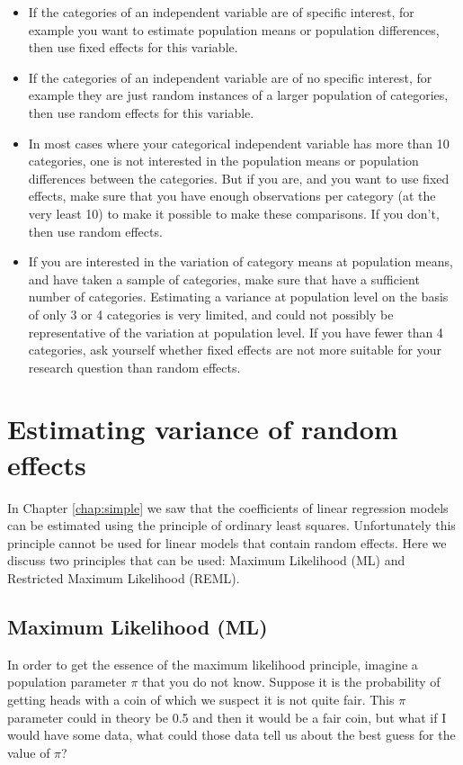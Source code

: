 \begin{itemize}
\item
If the categories of an independent variable are of specific interest, for example you want to estimate population means or population differences, then use fixed effects for this variable.
\item
If the categories of an independent variable are of no specific interest, for example they are just random instances of a larger population of categories, then use random effects for this variable.
\item
In most cases where your categorical independent variable has more than 10 categories, one is not interested in the population means or population differences between the categories. But if you are, and you want to use fixed effects, make sure that you have enough observations per category (at the very least 10) to make it possible to make these comparisons. If you don't, then use random effects.
\item
If you are interested in the variation of category means at population means, and have taken a sample of categories, make sure that have a sufficient number of categories. Estimating a variance at population level on the basis of only 3 or 4 categories is very limited, and could not possibly be representative of the variation at population level. If you have fewer than 4 categories, ask yourself whether fixed effects are not more suitable for your research question than random effects.
\end{itemize}


\section{Estimating variance of random effects}

In Chapter \ref{chap:simple} we saw that the coefficients of linear regression models can be estimated using the principle of ordinary least squares. Unfortunately this principle cannot be used for linear models that contain random effects. Here we discuss two principles that can be used: Maximum Likelihood (ML) and Restricted Maximum Likelihood (REML).

\subsection{Maximum Likelihood (ML)}

In order to get the essence of the maximum likelihood principle, imagine a population parameter $\pi$ that you do not know. Suppose it is the probability of getting heads with a coin of which we suspect it is not quite fair. This $\pi$ parameter could in theory be 0.5 and then it would be a fair coin, but what if I would have some data, what could those data tell us about the best guess for the value of $\pi$?

